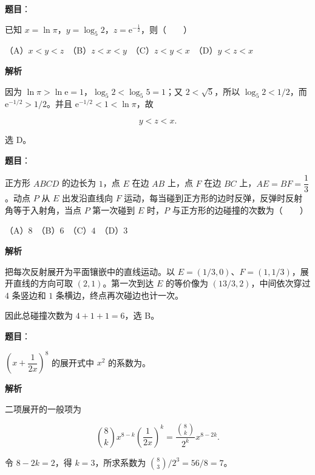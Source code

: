 \begin{answer}

\textbf{题目}：

已知 $x=\ln\pi$，$y=\log_5 2$，$z=\mathrm e^{-\frac12}$，则\mbox{（　　）}

（A）$x<y<z$　（B）$z<x<y$　（C）$z<y<x$　（D）$y<z<x$

\textbf{解析}

因为 $\ln\pi>\ln\mathrm e=1$，$\log_5 2<\log_5 5=1$；又 $2<\sqrt5$，所以 $\log_5 2<1/2$，而 $\mathrm e^{-1/2}>1/2$。并且 $\mathrm e^{-1/2}<1<\ln\pi$，故

\nopagebreak[4]
\[
y<z<x.
\]

选 D。


\end{answer}
\begin{answer}

\textbf{题目}：

正方形 $ABCD$ 的边长为 $1$，点 $E$ 在边 $AB$ 上，点 $F$ 在边 $BC$ 上，$AE=BF=\dfrac13$。动点 $P$ 从 $E$ 出发沿直线向 $F$ 运动，每当碰到正方形的边时反弹，反弹时反射角等于入射角，当点 $P$ 第一次碰到 $E$ 时，$P$ 与正方形的边碰撞的次数为\mbox{（　　）}

（A）$8$　（B）$6$　（C）$4$　（D）$3$

\textbf{解析}

把每次反射展开为平面镶嵌中的直线运动。以 $E=(1/3,0)$、$F=(1,1/3)$，展开直线的方向可取 $(2,1)$。第一次到达 $E$ 的等价像为 $(13/3,2)$，中间依次穿过 $4$ 条竖边和 $1$ 条横边，终点再次碰边也计一次。

因此总碰撞次数为 $4+1+1=6$，选 B。


\end{answer}
\begin{answer}

\textbf{题目}：

$\left(x+\dfrac1{2x}\right)^8$ 的展开式中 $x^2$ 的系数为\underline{\hspace{2cm}}。

\textbf{解析}

二项展开的一般项为

\nopagebreak[4]
\[
\binom8k x^{8-k}\left(\frac1{2x}\right)^k
=\frac{\binom8k}{2^k}x^{8-2k}.
\]

令 $8-2k=2$，得 $k=3$，所求系数为 $\binom83/2^3=56/8=7$。


\end{answer}
